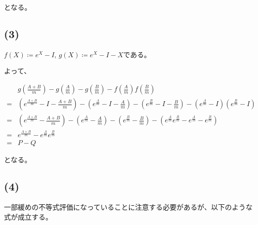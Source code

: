 \documentclass[a4paper, 10pt, dvipdfmx]{jlreq}
\begin{document}
となる。

\subsection*{(3)}

$f(X)\coloneqq e^X-I$, $g(X)\coloneqq e^X-I-X$である。

よって、

\begin{align*}
       & g\left(\frac{A+B}{m}\right)-g\left(\frac{A}{m}\right)-g\left(\frac{B}{m}\right)-f\left(\frac{A}{m}\right)f\left(\frac{B}{m}\right)                                                                         \\
  = {} & \left(e^{\frac{A+B}{m}}-I-\frac{A+B}{m}\right)-\left(e^{\frac{A}{m}}-I-\frac{A}{m}\right)-\left(e^{\frac{B}{m}}-I-\frac{B}{m}\right)-\left(e^{\frac{A}{m}}-I\right)\left(e^{\frac{B}{m}}-I\right)          \\
  = {} & \left(e^{\frac{A+B}{m}}-\frac{A+B}{m}\right)-\left(e^{\frac{A}{m}}-\frac{A}{m}\right)-\left(e^{\frac{B}{m}}-\frac{B}{m}\right)-\left(e^{\frac{A}{m}}e^{\frac{B}{m}}-e^{\frac{A}{m}}-e^{\frac{B}{m}}\right) \\
  = {} & e^{\frac{A+B}{m}}-e^{\frac{A}{m}}e^{\frac{B}{m}}                                                                                                                                                           \\
  = {} & P-Q
\end{align*}

となる。

\subsection*{(4)}

一部緩めの不等式評価になっていることに注意する必要があるが、以下のような式が成立する。
\end{document}
